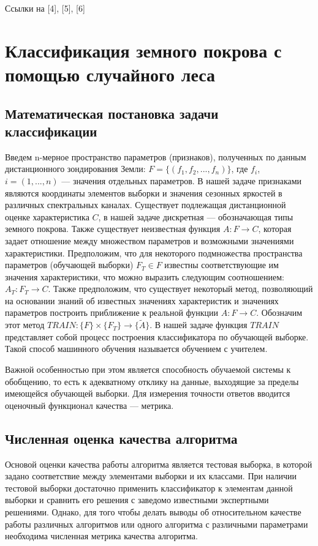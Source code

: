 \documentclass[14pt, a4paper, oneside]{extarticle}
\begin{document}
Ссылки на [4], [5], [6]
\newpage

\section{Классификация земного покрова с помощью случайного леса}
\subsection{Математическая постановка задачи классификации}
Введем n-мерное пространство параметров (признаков), полученных по данным дистанционного зондирования Земли: $F=\{(f_1, f_2, ..., f_n)\}$, где $f_i$, $i=(1, ..., n)$ --- значения отдельных параметров. В нашей задаче признаками являются координаты элементов выборки и значения сезонных яркостей в различных спектральных каналах. Существует подлежащая дистанционной оценке характеристика $C$, в нашей задаче дискретная --- обозначающая типы земного покрова. Также существует неизвестная функция $A: F \to C$, которая задает отношение между множеством параметров и возможными значениями характеристики. Предположим, что для некоторого подмножества пространства параметров (обучающей выборки) $F_T \in F$ известны соответствующие им значения характеристики, что можно выразить следующим соотношением: $A_T: F_T \to C$. Также предположим, что существует некоторый метод, позволяющий на основании знаний об известных значениях характеристик и значениях параметров построить приближение к реальной функции $A: F \to C$. Обозначим этот метод $TRAIN: \{F\} \times \{F_T\} \to \{\widetilde{A}\}$. В нашей задаче функция $TRAIN$ представляет собой процесс построения классификатора по обучающей выборке. Такой способ машинного обучения называется обучением с учителем.

Важной особенностью при этом является способность обучаемой системы к обобщению, то есть к адекватному отклику на данные, выходящие за пределы имеющейся обучающей выборки. Для измерения точности ответов вводится оценочный функционал качества --- метрика.

\subsection{Численная оценка качества алгоритма}
Основой оценки качества работы алгоритма является тестовая выборка, в которой задано соответствие между элементами выборки и их классами. При наличии тестовой выборки достаточно применить классификатор к элементам данной выборки и сравнить его решения с заведомо известными экспертными решениями. Однако, для того чтобы делать выводы об относительном качестве работы различных алгоритмов или одного алгоритма с различными параметрами необходима численная метрика качества алгоритма.
\end{document}

